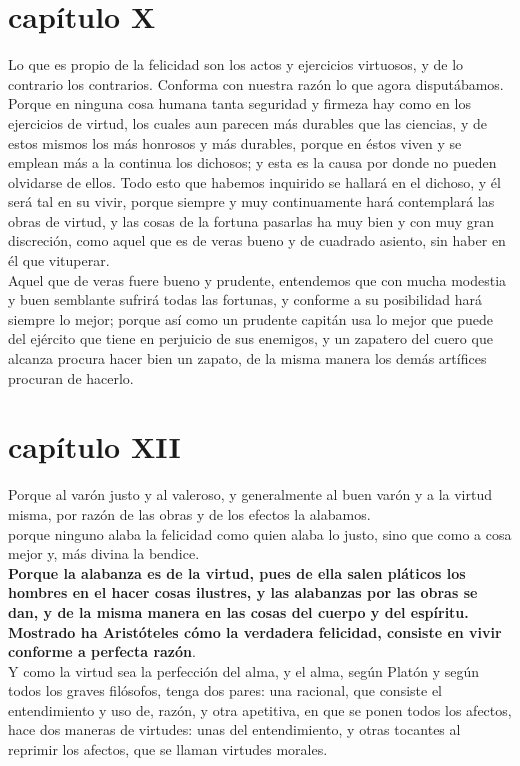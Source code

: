 \begin{multicols}{2}
\section*{capítulo X}
Lo que es propio de la felicidad son los actos y ejercicios virtuosos, y de lo contrario los contrarios. Conforma con nuestra razón lo que agora disputábamos. Porque en ninguna cosa humana tanta seguridad y firmeza hay como en los ejercicios de virtud, los cuales aun parecen más durables que las ciencias, y de estos mismos los más honrosos y más durables, porque en éstos viven y se emplean más a la continua los dichosos; y esta es la causa por donde no pueden olvidarse de ellos. Todo esto que habemos inquirido se hallará en el dichoso, y él será tal en su vivir, porque siempre y muy continuamente hará contemplará las obras de virtud, y las cosas de la fortuna pasarlas ha muy bien y con muy gran discreción, como aquel que es de veras bueno y de cuadrado asiento, sin haber en él que vituperar.\\
Aquel que de veras fuere bueno y prudente, entendemos que con mucha modestia y buen semblante sufrirá todas las fortunas, y conforme a su posibilidad hará siempre lo mejor; porque así como un prudente capitán usa lo mejor que puede del ejército que tiene en perjuicio de sus enemigos, y un zapatero del cuero que alcanza procura hacer bien un zapato, de la misma manera los demás artífices procuran de hacerlo. \\


\section*{capítulo XII}
Porque al varón justo y al valeroso, y generalmente al buen varón y a la virtud misma, por razón de las obras y de los efectos la alabamos.\\
porque ninguno alaba la felicidad como quien alaba lo justo, sino que como a cosa mejor y, más divina la bendice.\\
\textbf{Porque la alabanza es de la virtud, pues de ella salen pláticos los hombres en el hacer cosas ilustres, y las alabanzas por las obras se dan, y de la misma manera en las cosas del cuerpo y del espíritu.}\\
\textbf{Mostrado ha Aristóteles cómo la verdadera felicidad, consiste en vivir conforme a perfecta razón}.\\
Y como la virtud sea la perfección del alma, y el alma, según Platón y según todos los graves filósofos, tenga dos pares: una racional, que consiste el entendimiento y uso de, razón, y otra apetitiva, en que se ponen todos los afectos, hace dos maneras de virtudes: unas del entendimiento, y otras tocantes al reprimir los afectos, que se llaman virtudes morales.


\end{multicols}
